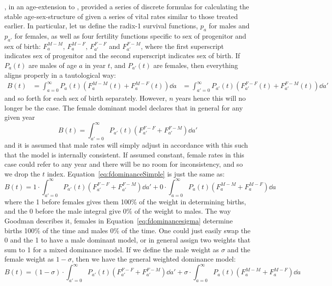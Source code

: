 \FloatBarrier

\citet{goodman1967age}, in an age-extension to \citet{goodman1953population},
provided a series of discrete formulas for calculating the
stable age-sex-structure of given a series of vital rates similar to those
treated earlier. In particular, let us define the radix-1 survival functions,
$p_a$ for males and $p_{a'}$ for females, as well as four fertility
functions specific to sex of progenitor and sex of birth:
$F_a^{M-M}$, $F_a^{M-F}$, $F_{a'}^{F-F}$ and  $F_{a'}^{F-M}$, where the first
superscript indicates sex of progenitor and the second superscript indicates sex
of birth. If $P_a(t)$ are males of age $a$ in year $t$, and $P_{a'}(t)$ are
females, then everything aligns properly in a tautological way:
\begin{align}
B(t) &= \int_{a=0}^\infty P_a(t) (F_a^{M-M}(t)+F_a^{M-F}(t)) \dd a
     &= \int_{a'=0}^\infty P_{a'}(t) (F_{a'}^{F-F}(t)+F_{a'}^{F-M}(t)) \dd a'
\end{align}
and so forth for each sex of birth separately. However, $n$ years hence this
will no longer be the case. The female dominant model declares that in general
for any given year
\begin{equation}
\label{eq:fdominanceSimple}
B(t) = \int_{a'=0}^\infty P_{a'}(t) (F_{a'}^{F-F}+F_{a'}^{F-M}) \dd a'
\end{equation}
and it is assumed that male rates will simply adjust in accordance with this
such that the model is internally consistent. If assumed constant, female rates
in this case could refer to any year and there will be no room for
inconsistency, and so we drop the $t$ index.
Equation~\eqref{eq:fdominanceSimple} is just the same as:
\begin{equation}
\label{eq:fdominancesigma}
B(t) = 1 \cdot \int_{a'=0}^\infty P_{a'}(t) (F_{a'}^{F-F}+F_{a'}^{F-M}) \dd a' +
       0 \cdot \int_{a=0}^\infty P_a(t) (F_a^{M-M}+F_a^{M-F}) \dd a
\end{equation}
where the 1 before females gives them 100\% of the weight in determining births,
and the 0 before the male integral give 0\% of the weight to males. The way
Goodman describes it, females in Equation~\ref{eq:fdominancesigma} determine
births 100\% of the time and males 0\% of the time. One could just easily
swap the 0 and the 1 to have a male dominant model, or in general assign two
weights that sum to 1 for a mixed dominance model. If we define the male weight
as $\sigma$ and the female weight as $1-\sigma$, then we have the general
weighted dominance model:
\begin{equation}
\label{eq:dominancesigma}
B(t) = (1-\sigma) \cdot \int_{a'=0}^\infty P_{a'}(t) (F_{a'}^{F-F}+F_{a'}^{F-M})
\dd a' + \sigma \cdot \int_{a=0}^\infty P_a(t) (F_a^{M-M}+F_a^{M-F}) \dd a
\end{equation}
